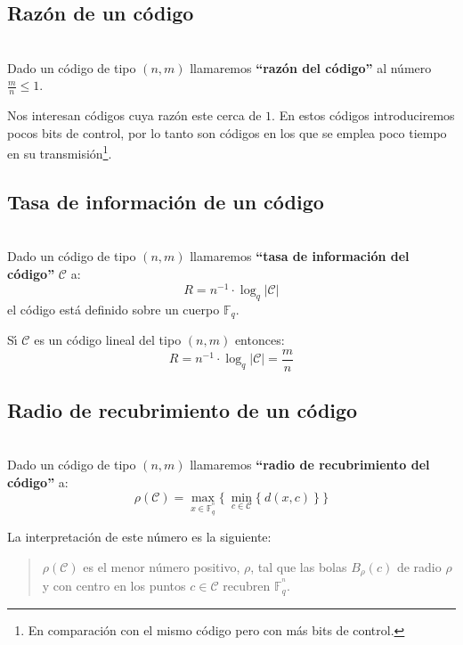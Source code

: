 \subsection{Raz\'on de un c\'odigo}

\begin{definicion}
\ \\
Dado un c\'odigo de tipo $(n,m)$ llamaremos \textbf{``raz\'on del c\'odigo''}
al n\'umero $\frac{m}{n}\leq 1$.
\end{definicion}
Nos interesan c\'odigos cuya raz\'on este cerca de $1$. En estos c\'odigos
introduciremos pocos bits de control, por lo tanto son c\'odigos en los que
se emplea poco tiempo en su transmisi\'on\footnote{En comparaci\'on con el
mismo c\'odigo pero con m\'as bits de control.}.

\subsection{Tasa de informaci\'on de un c\'odigo}

\begin{definicion}
\ \\
Dado un c\'odigo de tipo $(n,m)$ llamaremos \textbf{``tasa de informaci\'on del
c\'odigo''} $\mathcal{C}$ a:
\begin{displaymath}
R= n^{-1}\cdot \log_q |\mathcal{C}|
\end{displaymath}
el c\'odigo est\'a definido sobre un cuerpo $\mathbb{F}_q$.
\end{definicion}
S\'{\i} $\mathcal{C}$ es un c\'odigo lineal del tipo $(n,m)$ entonces:
\begin{displaymath}
R=n^{-1}\cdot \log_q |\mathcal{C}| = \frac{m}{n}
\end{displaymath}

\subsection{Radio de recubrimiento de un c\'odigo}

\begin{definicion}
\ \\
Dado un c\'odigo de tipo $(n,m)$ llamaremos \textbf{``radio de recubrimiento del
c\'odigo''} a:
\begin{displaymath}
\rho (\mathcal{C}) = \max_{x\in \mathbb{F}^{^n}_q}\{\ \min_{c\in \mathcal{C}}
\{\ d(x,c)\ \}\ \} 
\end{displaymath}
\end{definicion}
La interpretaci\'on de este n\'umero es la siguiente:
\begin{quote}
$\rho(\mathcal{C})$ es el menor n\'umero positivo, $\rho$, tal que las bolas
$B_{\rho}(c)$ de radio $\rho$ y con centro en los puntos $c\in \mathcal{C}$
recubren $\mathbb{F}^{^n}_q$.
\end{quote}
